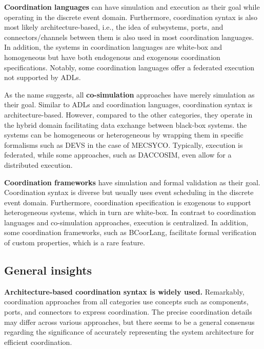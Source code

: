 \documentclass[runningheads]{llncs}
\begin{document}
\textbf{Coordination languages} can have simulation and execution as their goal while operating in the discrete event domain.
Furthermore, coordination syntax is also most likely architecture-based, i.e., the idea of subsystems, ports, and connectors/channels between them is also used in most coordination languages.
In addition, the systems in coordination languages are white-box and homogeneous but have both endogenous and exogenous coordination specifications.
Notably, some coordination languages offer a federated execution not supported by ADLs.

As the name suggests, all \textbf{co-simulation} approaches have merely simulation as their goal.
Similar to ADLs and coordination languages, coordination syntax is architecture-based.
However, compared to the other categories, they operate in the hybrid domain facilitating data exchange between black-box systems.
the systems can be homogeneous or heterogeneous by wrapping them in specific formalisms such as DEVS in the case of MECSYCO.
Typically, execution is federated, while some approaches, such as DACCOSIM, even allow for a distributed execution.

\textbf{Coordination frameworks} have simulation and formal validation as their goal.
Coordination syntax is diverse but usually uses event scheduling in the discrete event domain.
Furthermore, coordination specification is exogenous to support heterogeneous systems, which in turn are white-box.
In contrast to coordination languages and co-simulation approaches, execution is centralized.
In addition, some coordination frameworks, such as BCoorLang, facilitate formal verification of custom properties, which is a rare feature.

\subsection{General insights}

\textbf{Architecture-based coordination syntax is widely used.}
Remarkably, coordination approaches from all categories use concepts such as components, ports, and connectors to express coordination.
The precise coordination details may differ across various approaches, but there seems to be a general consensus regarding the significance of accurately representing the system architecture for efficient coordination.
\end{document}
